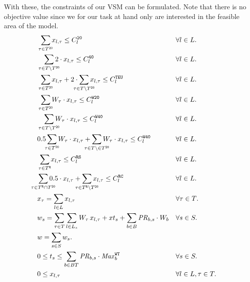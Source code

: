 With these, the constraints of our VSM can be formulated. Note that there is no objective value since we for our task at hand only are interested in the feasible area of the model.
\begin{align}
	\label{20Cap}
	&\smashoperator[r]{\sum_{\tau \in T^\trt{20}}} x_{l,\tau} \leq C_l^\trt{20}
			&& \forall l \in L.\\
	\label{40Cap}    	
	&\smashoperator[r]{\sum_{\tau \in T\setminus T^\trt{20}}} 2\cdot x_{l,\tau} \leq C_l^\trt{40} 
			&& \forall l \in L.\\
	\label{teuCap}
	&\smashoperator[r]{\sum_{\tau \in T^\trt{20}}} x_{l,\tau} + 2\cdot\smashoperator[lr]{\sum_{\tau \in T\setminus T^\trt{20}}} x_{l,\tau} \leq C_l^\trt{TEU} 
			&& \forall l \in L.\\
	\label{weight20Cap}
	&\smashoperator[r]{\sum_{\tau \in T^\trt{20}}} W_\tau\cdot x_{l,\tau} \leq C_l^\trt{W20} 
			&& \forall l \in L.\\
	\label{weight40Cap}
	&\smashoperator[r]{\sum_{\tau \in T\setminus T^\trt{20}}} W_\tau\cdot x_{l,\tau} \leq C_l^\trt{W40} 
			&& \forall l \in L. \\
	\label{combinedWeightCap}
	&0.5 \smashoperator[lr]{\sum_{\tau \in T^\trt{20}}} W_\tau\cdot x_{l,\tau} + \smashoperator[lr]{\sum_{\tau \in T\setminus \in T^\trt{20}}} W_\tau\cdot x_{l,\tau} \leq C_l^\trt{W40} 
			&& \forall l \in L.\\
	\label{reeferSlotCap}
	&\smashoperator[r]{\sum_{\tau \in T^\trt{R}}} x_{l,\tau} \leq C_l^\trt{RS} 
			&& \forall l \in L. \\
	\label{reeferCellCap}
	&\smashoperator[lr]{\sum_{\tau \in T^\trt{R}\cap T^\trt{20}}} 0.5\cdot x_{l,\tau} + \smashoperator[lr]{\sum_{\tau \in T^\trt{R}\setminus T^\trt{20}}} x_{l,\tau} \leq C_l^\trt{RC} 
			&& \forall l \in L.\\
	\label{typeDef}
	&x_\tau = \sum_{l\in L} x_{l,\tau} 
			&& \forall{\tau \in T}.\\
	\label{totalWeightDef}
	&w_s = \sum_{\tau \in T} \sum_{l\in L_s} W_\tau\, x_{l,\tau} + xt_s + \sum_{b\in B} \mi{PR}_{b,s}\cdot W_b 
			&& \forall s \in S.\\
	\label{totalDisp}
	&w  = \sum_{s\in S} w_s. 
			&&\\
	\label{btLim}
	&0 \leq t_s \leq \sum_{b \in BT} \mi{PR}_{b,s}\cdot \mi{Max}^\trt{WT}_b 
			&& \forall s\in S.\\
	\label{xPos}
	&0 \leq x_{l,\tau} 
			&& \forall l\in L, \tau\in T.\\

\end{align}
